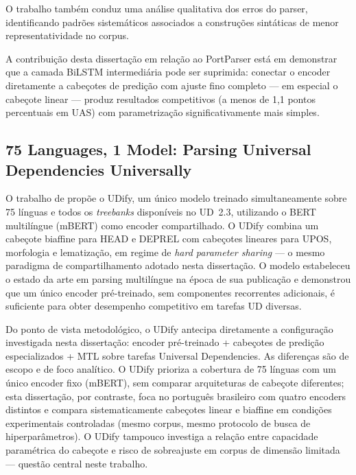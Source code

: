O trabalho também conduz uma análise qualitativa dos erros do parser, identificando padrões
sistemáticos associados a construções sintáticas de menor representatividade no corpus.

A contribuição desta dissertação em relação ao PortParser está em demonstrar que a camada
BiLSTM intermediária pode ser suprimida: conectar o encoder diretamente a cabeçotes de
predição com ajuste fino completo — em especial o cabeçote linear — produz resultados
competitivos (a menos de 1,1 pontos percentuais em UAS) com parametrização
significativamente mais simples.

\subsection*{75 Languages, 1 Model: Parsing Universal Dependencies Universally}

O trabalho de \citeauthor{kondratyuk201975} \cite{kondratyuk201975} propõe o UDify, um
único modelo treinado simultaneamente sobre 75 línguas e todos os \textit{treebanks}
disponíveis no UD~2.3, utilizando o BERT multilíngue (mBERT) como encoder compartilhado.
O UDify combina um cabeçote biaffine para HEAD e DEPREL com cabeçotes lineares para UPOS,
morfologia e lematização, em regime de \textit{hard parameter sharing} — o mesmo paradigma
de compartilhamento adotado nesta dissertação. O modelo estabeleceu o estado da arte em
parsing multilíngue na época de sua publicação e demonstrou que um único encoder pré-treinado,
sem componentes recorrentes adicionais, é suficiente para obter desempenho competitivo em
tarefas UD diversas.

Do ponto de vista metodológico, o UDify antecipa diretamente a configuração investigada
nesta dissertação: encoder pré-treinado + cabeçotes de predição especializados + MTL sobre
tarefas Universal Dependencies. As diferenças são de escopo e de foco analítico. O UDify
prioriza a cobertura de 75 línguas com um único encoder fixo (mBERT), sem comparar
arquiteturas de cabeçote diferentes; esta dissertação, por contraste, foca no português
brasileiro com quatro encoders distintos e compara sistematicamente cabeçotes linear e
biaffine em condições experimentais controladas (mesmo corpus, mesmo protocolo de busca
de hiperparâmetros). O UDify tampouco investiga a relação entre capacidade paramétrica do
cabeçote e risco de sobreajuste em corpus de dimensão limitada — questão central neste
trabalho.

